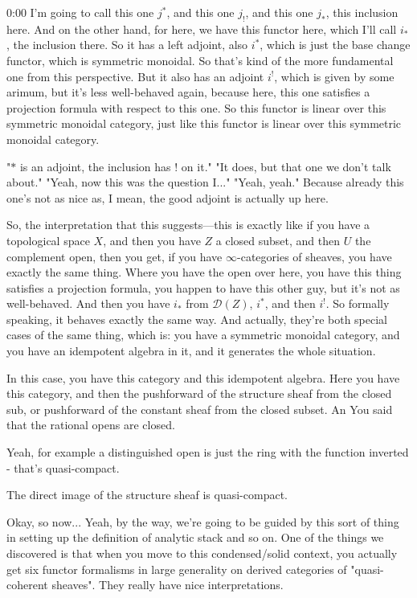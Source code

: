 \begin{unfinished}{0:00}
I'm going to call this one $j^*$, and this one $j_!$, and this one $j_*$, this inclusion here. And on the other hand, for here, we have this functor here, which I'll call $i_*$, the inclusion there. So it has a left adjoint, also $i^*$, which is just the base change functor, which is symmetric monoidal. So that's kind of the more fundamental one from this perspective. But it also has an adjoint $i^!$, which is given by some arimum, but it's less well-behaved again, because here, this one satisfies a projection formula with respect to this one. So this functor is linear over this symmetric monoidal category, just like this functor is linear over this symmetric monoidal category.

"$\ast$ is an adjoint, the inclusion has $!$ on it." 
"It does, but that one we don't talk about."
"Yeah, now this was the question I..."
"Yeah, yeah." Because already this one's not as nice as, I mean, the good adjoint is actually up here.

So, the interpretation that this suggests---this is exactly like if you have a topological space $X$, and then you have $Z$ a closed subset, and then $U$ the complement open, then you get, if you have $\infty$-categories of sheaves, you have exactly the same thing. Where you have the open over here, you have this thing satisfies a projection formula, you happen to have this other guy, but it's not as well-behaved. And then you have $i_*$ from $\mathcal{D}(Z)$, $i^*$, and then $i^!$. So formally speaking, it behaves exactly the same way. And actually, they're both special cases of the same thing, which is: you have a symmetric monoidal category, and you have an idempotent algebra in it, and it generates the whole situation.

In this case, you have this category and this idempotent algebra. Here you have this category, and then the pushforward of the structure sheaf from the closed sub, or pushforward of the constant sheaf from the closed subset. An
You said that the rational opens are closed.

Yeah, for example a distinguished open is just the ring with the function inverted - that's quasi-compact.

The direct image of the structure sheaf is quasi-compact.

Okay, so now... Yeah, by the way, we're going to be guided by this sort of thing in setting up the definition of analytic stack and so on. One of the things we discovered is that when you move to this condensed/solid context, you actually get six functor formalisms in large generality on derived categories of "quasi-coherent sheaves". They really have nice interpretations.


\end{unfinished}
